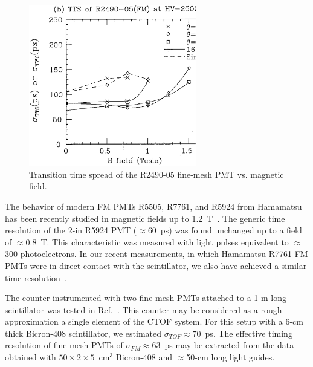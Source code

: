 \begin{figure}[htbp]
\centering
\includegraphics[width=0.65\textwidth]{fig04MC.ps}
\caption{\small{Transition time spread of the R2490-05 fine-mesh PMT vs. 
magnetic field.}}
\label{fmt}
\end{figure}

The behavior of modern FM PMTs R5505, R7761, and R5924 from Hamamatsu has 
been recently studied in magnetic fields up to 1.2~T~\cite{fmtr01}.  The 
generic time resolution of the 2-in R5924 PMT ($\approx$60~ps) was found 
unchanged up to a field of $\approx$0.8~T.  This characteristic was measured 
with light pulses equivalent to $\approx$300 photoelectrons.  In our recent
measurements, in which Hamamatsu R7761 FM PMTs were in direct contact with 
the scintillator, we also have achieved a similar time resolution~\cite{kuznetsov}. 

The counter instrumented with two fine-mesh PMTs attached to a 1-m long 
scintillator was tested in Ref.~\cite{foucher}.  This counter may be 
considered as a rough approximation a single element of the CTOF system.  
For this setup with a 6-cm thick Bicron-408 scintillator, we estimated 
$\sigma_{TOF}\approx 70$~ps.  The effective timing resolution of fine-mesh 
PMTs of $\sigma_{FM} \approx 63$~ps may be extracted from the data obtained
\cite{csn1} with  $50 \times 2 \times 5$~cm$^3$ Bicron-408 and 
$\approx$50-cm long light guides.

